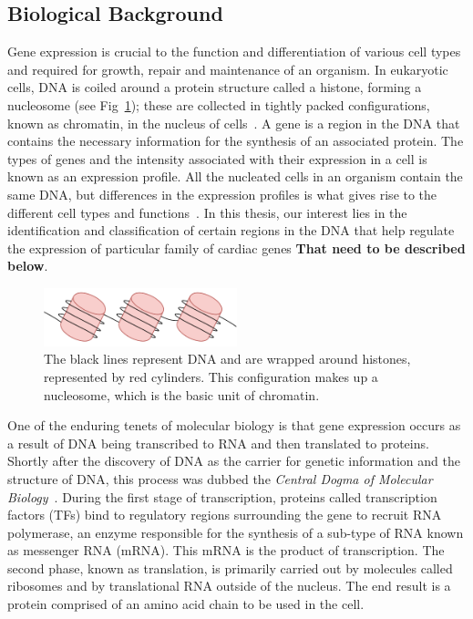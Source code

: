         \subsection{Biological Background}
        Gene expression is crucial to the function and differentiation of various cell types and required for growth, repair and maintenance of an organism.  In eukaryotic cells, DNA is coiled around a protein structure called a histone, forming a nucleosome (see Fig~\ref{fig:chromatin1}); these are collected in tightly packed configurations, known as chromatin, in the nucleus of cells~\cite{alberts2002chromosomal, kornberg1974chromatin}. A gene is a region in the DNA that contains the necessary information for the synthesis of an associated protein. The types of genes and the intensity associated with their expression in a cell is known as an expression profile. All the nucleated cells in an organism contain the same DNA, but differences in the expression profiles is what gives rise to the different cell types and functions~\cite{lockhart2000genomics}. In this thesis, our interest lies in the identification and classification of certain regions in the DNA that help regulate the expression of particular family of cardiac genes \textbf{That need to be described below}. 

        
            \begin{figure}[H]
                 \centering
            \includegraphics[width=0.5\textwidth]{Chromatin.pdf}
                \caption{The black lines represent DNA and are wrapped around histones, represented by red cylinders. This configuration makes up a nucleosome, which is the basic unit of chromatin.}
                \label{fig:chromatin1}
            \end{figure}
            

        
        
        One of the enduring tenets of molecular biology is that gene expression occurs as a result of DNA being transcribed to RNA and then translated to proteins. Shortly after the discovery of DNA as the carrier for genetic information and the structure of DNA, this process was dubbed the \emph{Central Dogma of Molecular Biology}~\cite{crick1958protein, macleod1944studies, watson1953structure}. During the first stage of transcription, proteins called transcription factors (TFs) bind to regulatory regions surrounding the gene to recruit RNA polymerase, an enzyme responsible for the synthesis of a sub-type of RNA known as messenger RNA (mRNA). This mRNA is the product of transcription. The second phase, known as translation, is primarily carried out by molecules called ribosomes and by translational RNA outside of the nucleus. The end result is a protein comprised of an amino acid chain to be used in the cell.
        
